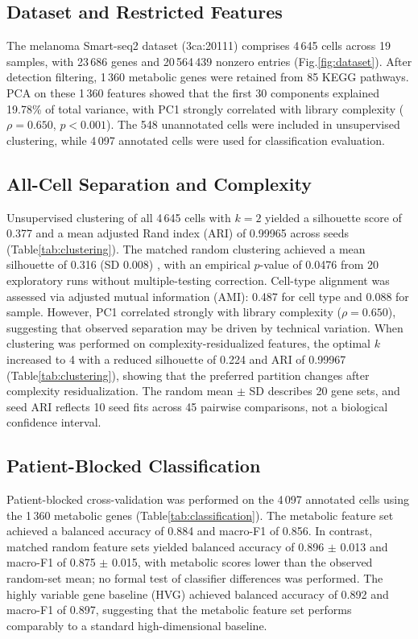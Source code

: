 \subsection{Dataset and Restricted Features}
The melanoma Smart-seq2 dataset (3ca:20111) comprises 4\,645 cells across 19 samples, with 23\,686 genes and 20\,564\,439 nonzero entries (Fig.\ref{fig:dataset}). After detection filtering, 1\,360 metabolic genes were retained from 85 KEGG pathways. PCA on these 1\,360 features showed that the first 30 components explained 19.78\% of total variance, with PC1 strongly correlated with library complexity ($\rho = 0.650$, $p < 0.001$). The 548 unannotated cells were included in unsupervised clustering, while 4\,097 annotated cells were used for classification evaluation.

\subsection{All-Cell Separation and Complexity}
Unsupervised clustering of all 4\,645 cells with $k=2$ yielded a silhouette score of 0.377 and a mean adjusted Rand index (ARI) of 0.99965 across seeds (Table\ref{tab:clustering}). The matched random clustering achieved a mean silhouette of 0.316 (SD 0.008) , with an empirical $p$-value of 0.0476 from 20 exploratory runs without multiple-testing correction. Cell-type alignment was assessed via adjusted mutual information (AMI): 0.487 for cell type and 0.088 for sample. However, PC1 correlated strongly with library complexity ($\rho = 0.650$), suggesting that observed separation may be driven by technical variation. When clustering was performed on complexity-residualized features, the optimal $k$ increased to 4 with a reduced silhouette of 0.224 and ARI of 0.99967 (Table\ref{tab:clustering}), showing that the preferred partition changes after complexity residualization. The random mean $\pm$ SD describes 20 gene sets, and seed ARI reflects 10 seed fits across 45 pairwise comparisons, not a biological confidence interval.

\subsection{Patient-Blocked Classification}
Patient-blocked cross-validation was performed on the 4\,097 annotated cells using the 1\,360 metabolic genes (Table\ref{tab:classification}). The metabolic feature set achieved a balanced accuracy of 0.884 and macro-F1 of 0.856. In contrast, matched random feature sets yielded balanced accuracy of 0.896 $\pm$ 0.013 and macro-F1 of 0.875 $\pm$ 0.015, with metabolic scores lower than the observed random-set mean; no formal test of classifier differences was performed. The highly variable gene baseline (HVG) achieved balanced accuracy of 0.892 and macro-F1 of 0.897, suggesting that the metabolic feature set performs comparably to a standard high-dimensional baseline.


